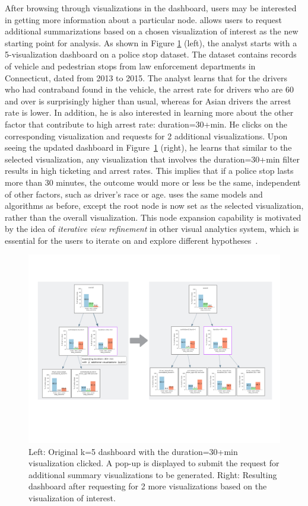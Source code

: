 \par After browsing through visualizations in the dashboard, users may be interested in getting more information about a particular node. \system allows users to request additional summarizations based on a chosen visualization of interest as the new starting point for analysis. As shown in Figure \ref{fig:altroot_expansion} (left), the analyst starts with a 5-visualization dashboard on a police stop dataset. The dataset contains  records of vehicle and pedestrian stops from law enforcement departments in Connecticut, dated from 2013 to 2015. The analyst learns that for the drivers who had contraband found in the vehicle, the arrest rate for drivers who are 60 and over is surprisingly higher than usual, whereas for Asian drivers the arrest rate is lower. In addition, he is also interested in learning more about the other factor that contribute to high arrest rate: duration=30+min. He clicks on the corresponding visualization and requests for 2 additional visualizations. Upon seeing the updated dashboard in Figure~\ref{fig:altroot_expansion} (right), he learns that similar to the selected visualization, any visualization that involves the duration=30+min filter results in high ticketing and arrest rates. This implies that if a police stop lasts more than 30 minutes, the outcome would more or less be the same, independent of other factors, such as driver's race or age. \system uses the same models and algorithms as before, except the root node is now set as the selected visualization, rather than the overall visualization. This node expansion capability is motivated by the idea of \textit{iterative view refinement} in other visual analytics system, which is essential for the users to iterate on and explore different hypotheses~\cite{Wongsuphasawat2016,Hoque2017}.

\begin{figure}[ht!]
\centering
\includegraphics[width=\linewidth]{figures/expansion_example.pdf}
\caption{Left: Original k=5 dashboard with the duration=30+min visualization clicked. A pop-up is displayed to submit the request for additional summary visualizations to be generated. Right: Resulting dashboard after requesting for 2 more visualizations based on the visualization of interest.}
\label{fig:altroot_expansion}
\end{figure}

